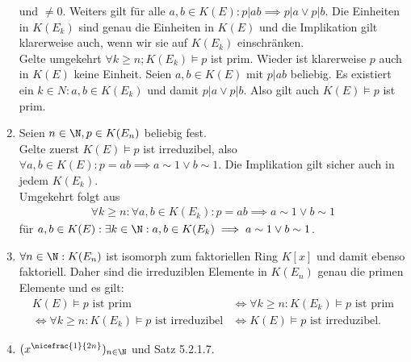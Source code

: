\begin{solution}
\begin{enumerate}
  und $\neq 0$. Weiters gilt für alle $a,b \in K(E): p|ab \implies p|a \lor p|b$.
  Die Einheiten in $K(E_k)$ sind genau die Einheiten in $K(E)$ und die Implikation
  gilt klarerweise auch, wenn wir sie auf $K(E_k)$ einschränken. \\
  Gelte umgekehrt $\forall k \geq n; K(E_k) \vDash p$ ist prim.
  Wieder ist klarerweise $p$ auch in $K(E)$ keine Einheit.
  Seien $a,b \in K(E)$ mit $p|ab$ beliebig. Es existiert ein $k \in N: a,b \in K(E_k)$
  und damit $p|a \lor p|b$. Also gilt auch $K(E) \vDash p$ ist prim.
  \item Seien $n \in \N, p \in K(E_n)$ beliebig fest. \\
  Gelte zuerst $K(E) \vDash p$ ist irreduzibel, also
  $\forall a,b \in K(E): p = ab \implies a \sim 1 \lor b \sim 1$.
  Die Implikation gilt sicher auch in jedem $K(E_k)$. \\
  Umgekehrt folgt aus
  \begin{align*}
    \forall k \geq n: \forall a,b \in K(E_k): p = ab \implies a \sim 1 \lor b \sim 1
  \end{align*}
  für $a,b \in K(E): \exists k \in \N: a,b \in K(E_k) \implies a \sim 1 \lor b \sim 1$.
  \item $\forall n \in \N: K(E_n)$ ist isomorph zum faktoriellen Ring $K[x]$ und damit ebenso faktoriell. Daher sind
  die irreduziblen Elemente in $K(E_n)$ genau die primen Elemente und es gilt:
  \begin{align*}
    K(E) \vDash p \text{ ist prim } &\iff \forall k \geq n: K(E_k) \vDash p \text{ ist prim} \\
    \iff \forall k \geq n: K(E_k) \vDash p \text{ ist irreduzibel}
    &\iff K(E) \vDash p \text{ ist irreduzibel}.
  \end{align*}
  \item $(x^{\nicefrac{1}{2n}})_{n \in \N}$ und Satz 5.2.1.7.
\end{enumerate}
\end{solution}
